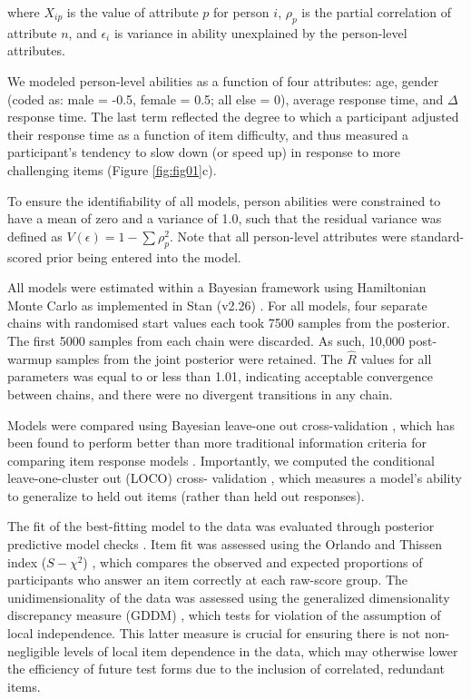 \documentclass[a4paper,man,natbib]{apa6}
\begin{document}
\noindent where $X_{ip}$ is the value of attribute $p$ for person $i$, $\rho_p$ is the partial correlation of attribute $n$, and $\epsilon_i$ is variance in ability unexplained by the person-level attributes.

We modeled person-level abilities as a function of four attributes: age, gender (coded as: male = -0.5, female = 0.5; all else = 0), average response time, and $\Delta$ response time. The last term reflected the degree to which a participant adjusted their response time as a function of item difficulty, and thus measured a participant's tendency to slow down (or speed up) in response to more challenging items (Figure \ref{fig:fig01}c).

To ensure the identifiability of all models, person abilities were constrained to have a mean of zero and a variance of 1.0, such that the residual variance was defined as $V(\epsilon) = 1 - \sum \rho_p^2$. Note that all person-level attributes were standard-scored prior being entered into the model.

All models were estimated within a Bayesian framework using Hamiltonian Monte Carlo as implemented in Stan (v2.26) \citep{carpenter2017stan}. For all models, four separate chains with randomised start values each took 7500 samples from the posterior. The first 5000 samples from each chain were discarded. As such, 10,000 post-warmup samples from the joint posterior were retained. The $\hat{R}$ values for all parameters was equal to or less than 1.01, indicating acceptable convergence between chains, and there were no divergent transitions in any chain. 

Models were compared using Bayesian leave-one out cross-validation \citep{vehtari2017practical}, which has been found to perform better than more traditional information criteria for comparing item response models \citep{luo2017performances}. Importantly, we computed the conditional leave-one-cluster out (LOCO) cross- validation \citep{merkle2019bayesian}, which measures a model's ability to generalize to held out items (rather than held out responses). 

The fit of the best-fitting model to the data was evaluated through posterior predictive model checks \citep{gelman1996posterior, levy2017bayesian}. Item fit was assessed using the Orlando and Thissen index ($S-\chi^2$) \citep{toribio2011discrepancy}, which compares the observed and expected proportions of participants who answer an item correctly at each raw-score group. The unidimensionality of the data was assessed using the generalized dimensionality discrepancy measure (GDDM) \citep{levy2011generalized}, which tests for violation of the assumption of local independence. This latter measure is crucial for ensuring there is not non-negligible levels of local item dependence in the data, which may otherwise lower the efficiency of future test forms due to the inclusion of correlated, redundant items.    
\end{document}
